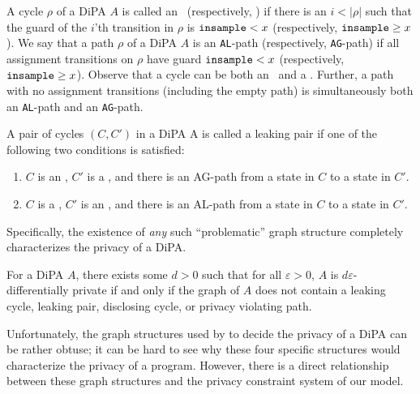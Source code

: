 \begin{defn}
    A cycle $\rho$ of a DiPA $A$ is called an \lcycle~(respectively, \gcycle) if there is an $i< |\rho|$ such that the guard of the $i$'th transition in $\rho$ is $\texttt{insample} < x$ (respectively, $\texttt{insample}\geq x$).
    We say that a path $\rho$ of a DiPA $A$ is an \texttt{AL}-path (respectively, \texttt{AG}-path) if all assignment transitions on $\rho$ have guard $\texttt{insample} < x$ (respectively, $\texttt{insample}\geq x$).
    Observe that a cycle can be both an \lcycle~and a \gcycle.
    Further, a path with no assignment transitions (including the empty path) is simultaneously both an \texttt{AL}-path and an \texttt{AG}-path.
\end{defn} 
\begin{defn}\label{defLeakingPairs}
    A pair of cycles $(C, C')$ in a DiPA A is called a leaking pair if one of the following two conditions is satisfied:
    \begin{enumerate}
        \item $C$ is an \lcycle, $C'$ is a \gcycle, and there is an AG-path
        from a state in $C$ to a state in $C'$.
        \item $C$ is a \gcycle, $C'$ is an \lcycle, and there is an AL-path
        from a state in $C$ to a state in $C'$.
    \end{enumerate}
\end{defn} 

Specifically, the existence of \textit{any} such ``problematic'' graph structure completely characterizes the privacy of a DiPA. 

\begin{thm}\label{DiPACounterexamplesThm}
    For a DiPA $A$, there exists some $d>0$ such that for all $\varepsilon>0$, $A$ is $d\varepsilon$-differentially private if and only if the graph of $A$ does not contain a leaking cycle, leaking pair, disclosing cycle, or privacy violating path.
\end{thm}

Unfortunately, the graph structures used by \cite{chadhaLinearTimeDecidability2021} to decide the privacy of a DiPA can be rather obtuse; it can be hard to see why these four specific structures would characterize the privacy of a program. However, there is a direct relationship between these graph structures and the privacy constraint system of our model. 

